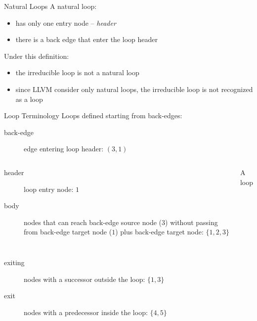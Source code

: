 \begin{frame}{Natural Loops}
A natural loop:

\begin{itemize}
\item has only one entry node -- \emph{header}
\item there is a back edge that enter the loop header
\end{itemize}

\vfill
Under this definition:

\begin{itemize}
\item the irreducible loop is not a natural loop
\item since LLVM consider only natural loops, the irreducible loop \alert{is not
      recognized} as a loop
\end{itemize}
\end{frame}

\begin{frame}{Loop Terminology}
Loops defined starting from back-edges:

\vfill
\begin{description}
\item[back-edge] edge entering loop header: $(3,1)$
\end{description}

\begin{columns}[t]
\begin{description}
\item[header] loop entry node: $1$
\item[body] nodes that can reach back-edge source node ($3$) without passing
            from back-edge target node ($1$) plus back-edge target node:
            $\{1 ,2, 3\}$
\end{description}
\vspace*{-1em}
\begin{block}{\small A loop}
\vspace*{-1em}

\end{block}


\end{columns}

\begin{description}
\item[exiting] nodes with a successor outside the loop: $\{1, 3\}$
\item[exit] nodes with a predecessor inside the loop: $\{4, 5\}$
\end{description}
\end{frame}

